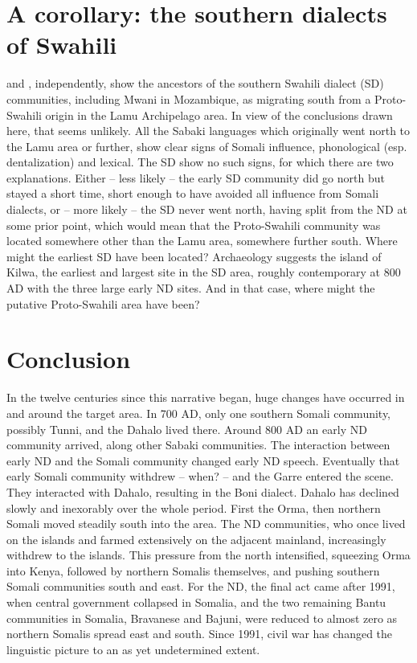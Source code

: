 \documentclass[output=paper
,newtxmath
,modfonts
,nonflat]{langsci/langscibook}
\begin{document}
\section{A corollary: the southern dialects of Swahili}\label{sec:nurse:6} \citet[map p.345]{Möhlig1984} and \citet[map p.60]{Nurse1985}, independently, show the ancestors of the southern Swahili dialect (SD) communities, including Mwani in Mozambique, as migrating south from a Proto-Swahili origin in the Lamu Archipelago area. In view of the conclusions drawn here, that seems unlikely. All the Sabaki languages which originally went north to the Lamu area or further, show clear signs of Somali influence, phonological (esp. dentalization) and lexical. The SD show no such signs, for which there are two explanations. Either – less likely – the early SD community did go north but stayed a short time, short enough to have avoided all influence from Somali dialects, or – more likely – the SD never went north, having split from the ND at some prior point, which would mean that the Proto-Swahili community was located somewhere other than the Lamu area, somewhere further south. Where might the earliest SD have been located? Archaeology suggests the island of Kilwa, the earliest and largest site in the SD area, roughly contemporary at 800 AD with the three large early ND sites. And in that case, where might the putative Proto-Swahili area have been?

\section{Conclusion}\label{sec:nurse:7}  In the twelve centuries since this narrative began, huge changes have occurred in and around the target area. In 700 AD, only one southern Somali community, possibly Tunni, and the Dahalo lived there. Around 800 AD an early ND community arrived, along other Sabaki communities. The interaction between early ND and the Somali community changed early ND speech. Eventually that early Somali community withdrew – when? – and the Garre entered the scene. They interacted with Dahalo, resulting in the Boni dialect. Dahalo has declined slowly and inexorably over the whole period. First the Orma, then northern Somali moved steadily south into the area. The ND communities, who once lived on the islands and farmed extensively on the adjacent mainland, increasingly withdrew to the islands. This pressure from the north intensified, squeezing Orma into Kenya, followed by northern Somalis themselves, and pushing southern Somali communities south and east. For the ND, the final act came after 1991, when central government collapsed in Somalia, and the two remaining Bantu communities in Somalia, Bravanese and Bajuni, were reduced to almost zero as northern Somalis spread east and south. Since 1991, civil war has changed the linguistic picture to an as yet undetermined extent. 
\end{document}
